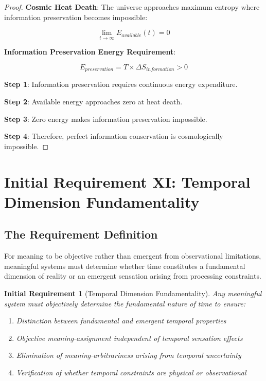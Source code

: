 \documentclass[12pt,a4paper]{article}
\newtheorem{requirement}[theorem]{Initial Requirement}
\begin{document}
\begin{proof}
\textbf{Cosmic Heat Death}: The universe approaches maximum entropy where information preservation becomes impossible:

$$\lim_{t \to \infty} E_{available}(t) = 0$$

\textbf{Information Preservation Energy Requirement}:

$$E_{preservation} = T \times \Delta S_{information} > 0$$

\textbf{Step 1}: Information preservation requires continuous energy expenditure.

\textbf{Step 2}: Available energy approaches zero at heat death.

\textbf{Step 3}: Zero energy makes information preservation impossible.

\textbf{Step 4}: Therefore, perfect information conservation is cosmologically impossible.
\end{proof}

\section{Initial Requirement XI: Temporal Dimension Fundamentality}

\subsection{The Requirement Definition}

For meaning to be objective rather than emergent from observational limitations, meaningful systems must determine whether time constitutes a fundamental dimension of reality or an emergent sensation arising from processing constraints.

\begin{requirement}[Temporal Dimension Fundamentality]
Any meaningful system must objectively determine the fundamental nature of time to ensure:
\begin{enumerate}
\item Distinction between fundamental and emergent temporal properties
\item Objective meaning-assignment independent of temporal sensation effects
\item Elimination of meaning-arbitrariness arising from temporal uncertainty
\item Verification of whether temporal constraints are physical or observational
\end{enumerate}
\end{requirement}
\end{document}
